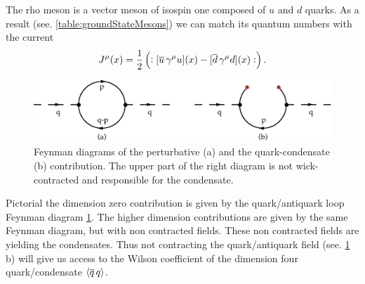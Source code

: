 \documentclass[../../index.tex]{subfiles}
\begin{document}
The rho meson is a vector meson of isospin one composed of \(u\) and \(d\)
quarks. As a result (see. \cref{table:groundStateMesons}) we can match its
quantum numbers with the current
\begin{equation}
  J^\mu(x) = \frac{1}{2}\left(:[\overline{u}\, \gamma^\mu u](x) - [\overline{d}\, \gamma^\mu d](x):\right).
\end{equation}
\begin{figure}
  \centering
  \includegraphics[width=\textwidth]{./images/condensateFeynmanDiagram.eps}
  \caption{Feynman diagrams of the perturbative (a) and the quark-condensate (b)
    contribution. The upper part of the right diagram is not wick-contracted and
    responsible for the condensate.}
  \label{fig:OPEFeynmanDiagram}
\end{figure}
Pictorial the dimension zero contribution is given by the quark\-/antiquark loop
Feynman diagram \cref{fig:OPEFeynmanDiagram}. The higher dimension contributions
are given by the same Feynman diagram, but with non contracted fields. These non
contracted fields are yielding the condensates. Thus not contracting the
quark\-/antiquark field (see. \cref{fig:OPEFeynmanDiagram} b) will give us
access to the Wilson coefficient of the dimension four quark\-/condensate
\(\langle \overline{q}\,q \rangle\).
\end{document}
